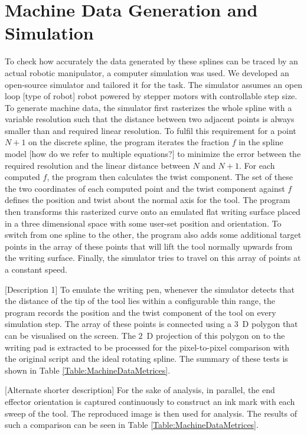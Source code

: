 \section{Machine Data Generation and Simulation}
\label{Chapter:Simulation}
    To check how accurately the data generated by these splines can be traced by an actual robotic manipulator, a computer simulation was used. We developed an open-source simulator and tailored it for the task. The simulator assumes an open loop [type of robot] robot powered by stepper motors with controllable step size. To generate machine data, the simulator first rasterizes the whole spline with a variable resolution such that the distance between two adjacent points is always smaller than and required linear resolution. To fulfil this requirement for a point $N + 1$ on the discrete spline, the program iterates the fraction $f$ in the spline model [how do we refer to multiple equations?] to minimize the error between the required resolution and the linear distance between $N$ and $N + 1$. For each computed $f$, the program then calculates the twist component. The set of these the two coordinates of each computed point and the twist component against $f$ defines the position and twist about the normal axis for the tool. The program then transforms this rasterized curve onto an emulated flat writing surface placed in a three dimensional space with some user-set position and orientation. To switch from one spline to the other, the program also adds some additional target points in the array of these points that will lift the tool normally upwards from the writing surface. Finally, the simulator tries to travel on this array of points at a constant speed.

    [Description 1]
    To emulate the writing pen, whenever the simulator detects that the distance of the tip of the tool lies within a configurable thin range, the program records the position and the twist component of the tool on every simulation step. The array of these points is connected using a $3$~D polygon that can be visualised on the screen. The $2$~D projection of this polygon on to the writing pad is extracted to be processed for the pixel-to-pixel comparison with the original script and the ideal rotating spline. The summary of these tests is shown in Table \ref{Table:MachineDataMetrices}.

    [Alternate shorter description]
    For the sake of analysis, in parallel, the end effector orientation is captured continuously to construct an ink mark with each sweep of the tool. The reproduced image is then used for analysis. The results of such a comparison can be seen in Table \ref{Table:MachineDataMetrices}.

